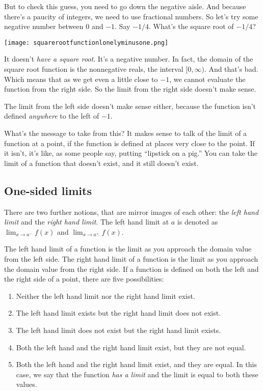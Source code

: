 \documentclass[10pt]{amsart}
\begin{document}
But to check this guess, you need to go down the negative aisle. And
because there's a paucity of integers, we need to use fractional
numbers. So let's try some negative number between $0$ and $-1$. Say
$-1/4$. What's the square root of $-1/4$?

\texttt{[image: squarerootfunctionlonelyminusone.png]}

It doesn't {\em have a square root}. It's a negative number. In fact,
the domain of the square root function is the nonnegative reals, the
interval $[0,\infty)$. And that's bad. Which means that as we get even
a little close to $-1$, we cannot evaluate the function from the right
side. So the limit from the right side doesn't make sense.

The limit from the left side doesn't make sense either, because the
function isn't defined {\em anywhere} to the left of $-1$.

What's the message to take from this? It makes sense to talk of the
limit of a function at a point, if the function is defined at places
very close to the point. If it isn't, it's like, as some people say,
putting ``lipstick on a pig.'' You can take the limit of a function
that doesn't exist, and it still doesn't exist.

\subsection{One-sided limits}

There are two further notions, that are mirror images of each
other: the {\em left hand limit} and the {\em right hand limit}. The
left hand limit at $a$ is denoted as $\lim_{x \to a^-} f(x)$ and
$\lim_{x \to a^+} f(x)$.

The left hand limit of a function is the limit as you approach the
domain value from the left side. The right hand limit of a function is
the limit as you approach the domain value from the right side. If a
function is defined on both the left and the right side of a point,
there are five possibilities:

\begin{enumerate}

\item Neither the left hand limit nor the right hand limit exist.

\item The left hand limit exists but the right hand limit does not
  exist.

\item The left hand limit does not exist but the right hand limit
  exists.

\item Both the left hand and the right hand limit exist, but they are
  not equal.

\item Both the left hand and the right hand limit exist, and they are
  equal. In this case, we say that the function {\em has a limit} and
  the limit is equal to both these values.

\end{enumerate}
\end{document}
